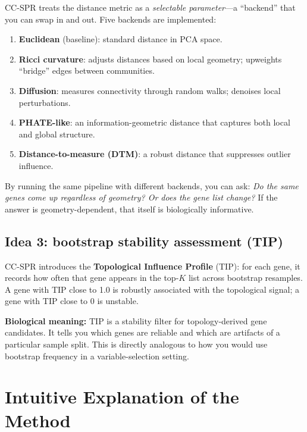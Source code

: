 \documentclass[11pt]{article}
\makeatletter
\newenvironment{biobox}{%
  \par\vspace{8pt}\noindent\fboxrule=1pt\fboxsep=8pt%
  \begin{lrbox}{\@tempboxa}\begin{minipage}{\dimexpr\linewidth-2\fboxsep-2\fboxrule}}%
  {\end{minipage}\end{lrbox}\fcolorbox{green!40!black}{white}{\usebox{\@tempboxa}}\par\vspace{8pt}}
\makeatother
\begin{document}
CC-SPR treats the distance metric as a \emph{selectable parameter}---a ``backend'' that you can swap in and out.
Five backends are implemented:
\begin{enumerate}[leftmargin=1.5em]
\item \textbf{Euclidean} (baseline): standard distance in PCA space.
\item \textbf{Ricci curvature}: adjusts distances based on local geometry; upweights ``bridge'' edges between communities.
\item \textbf{Diffusion}: measures connectivity through random walks; denoises local perturbations.
\item \textbf{PHATE-like}: an information-geometric distance that captures both local and global structure.
\item \textbf{Distance-to-measure (DTM)}: a robust distance that suppresses outlier influence.
\end{enumerate}

By running the same pipeline with different backends, you can ask: \emph{Do the same genes come up regardless of geometry? Or does the gene list change?}
If the answer is geometry-dependent, that itself is biologically informative.

\subsection{Idea 3: bootstrap stability assessment (TIP)}

CC-SPR introduces the \textbf{Topological Influence Profile} (TIP): for each gene, it records how often that gene appears in the top-$K$ list across bootstrap resamples.
A gene with TIP close to 1.0 is robustly associated with the topological signal; a gene with TIP close to 0 is unstable.

\begin{biobox}
\textbf{Biological meaning:} TIP is a stability filter for topology-derived gene candidates.
It tells you which genes are reliable and which are artifacts of a particular sample split.
This is directly analogous to how you would use bootstrap frequency in a variable-selection setting.
\end{biobox}

\section{Intuitive Explanation of the Method}
\label{sec:intuitive}
\end{document}
